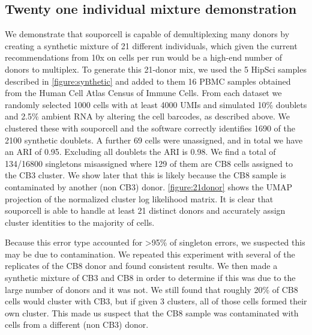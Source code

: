 \subsection{Twenty one individual mixture demonstration}
\par{
We demonstrate that souporcell is capable of demultiplexing many donors by creating a synthetic mixture
of 21 different individuals, which given the current recommendations from 10x on cells per run would be
a high-end number of donors to multiplex. To generate this 21-donor mix, we used the 5 HipSci samples
described in \ref{figure:synthetic} and added to them 16 PBMC samples obtained from the Human Cell Atlas Census of
Immune Cells. From each dataset we randomly selected 1000 cells with at least 4000 UMIs and
simulated 10\% doublets and 2.5\% ambient RNA by altering the cell barcodes, as described above. We
clustered these with souporcell and the software correctly identifies 1690 of the 2100 synthetic doublets.
A further 69 cells were unassigned, and in total we have an ARI of 0.95. Excluding all doublets the ARI
is 0.98. We find a total of 134/16800 singletons misassigned where 129 of them are CB8 cells assigned to
the CB3 cluster. We show later that this is likely because the CB8 sample is contaminated by another
(non CB3) donor. \ref{figure:21donor} shows the UMAP projection of the normalized cluster log likelihood
matrix. It is clear that souporcell is able to handle at least 21 distinct donors and accurately assign cluster
identities to the majority of cells. 
}

\par{
Because this error type accounted for >95\% of singleton errors, we suspected this may be due to
contamination. We repeated this experiment with several of the replicates of the CB8 donor and found
consistent results. We then made a synthetic mixture of CB3 and CB8 in order to determine if this was
due to the large number of donors and it was not. We still found that roughly 20\% of CB8 cells would
cluster with CB3, but if given 3 clusters, all of those cells formed their own cluster. This made us suspect 
that the CB8 sample was contaminated with cells from a different (non CB3) donor.
}


